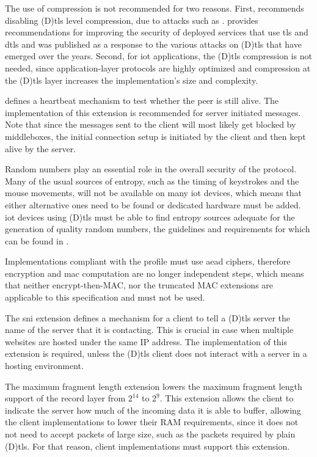 \documentclass{llncs}
\begin{document}
The use of compression is not recommended for two reasons. First, \cite{RFC7525}
recommends disabling (D)\gls{tls} level compression, due to attacks such as \cite{Microsof72:online}.
 provides recommendations for improving the security of deployed services
that use \gls{tls} and \gls{dtls} and was published as a response to the various
attacks on (D)\gls{tls} that have emerged over the years. Second, for \gls{iot} applications,
the (D)\gls{tls} compression is not needed, since application-layer protocols are highly
optimized and compression at the (D)\gls{tls} layer increases the implementation's size and complexity.

\cite{RFC6520} defines a heartbeat mechanism to test whether the peer
is still alive. The implementation of this extension is recommended for server
initiated messages. Note that since the messages sent to the client will most likely
get blocked by middleboxes, the initial connection setup is initiated by the
client and then kept alive by the server.

Random numbers play an essential role in the overall security of the protocol.
Many of the usual sources of entropy, such as the timing of keystrokes and the
mouse movements, will not be available on many \gls{iot} devices, which means that
either alternative ones need to be found or dedicated hardware must be added.
\gls{iot} devices using (D)\gls{tls} must be able to find entropy sources adequate for the generation of quality
random numbers, the guidelines and requirements for which can be found in \cite{rfc4086}.

Implementations compliant with the profile must use \gls{aead} ciphers, therefore
encryption and \gls{mac} computation are no longer independent steps, which means
that neither encrypt-then-MAC\cite{RFC7366}, nor the truncated MAC\cite{RFC6066} extensions are applicable
to this specification and must not be used.

The \gls{sni} extension\cite{RFC6066} defines a mechanism for a client to
tell a (D)\gls{tls} server the name of the server that it is contacting. This is
crucial in case when multiple websites are hosted under the same IP address.
The implementation of this extension is required, unless the (D)\gls{tls}
client does not interact with a server in a hosting environment.

The maximum fragment length extension\cite{RFC6066} lowers the maximum fragment
length support of the record layer from $2^14$ to $2^9$. This extension allows
the client to indicate the server how much of the incoming data it is able to buffer,
allowing the client implementations to lower their RAM requirements, since it does not
not need to accept packets of large size, such as the  packets required by
plain (D)\gls{tls}. For that reason, client implementations must support this
extension.
\end{document}
